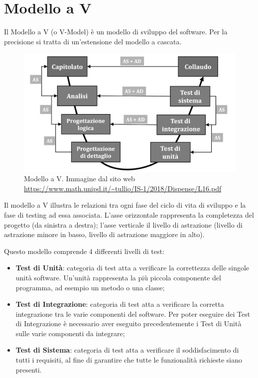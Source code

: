 \section{Modello a V}
\label{modelloV}

Il Modello a V (o V-Model) è un modello di sviluppo del software. Per la precisione si tratta di un'estensione del modello a cascata. 

\begin{figure}[H]
\centering
	\includegraphics[width=0.7\linewidth]{./images/modellov.jpg} 
	\caption{Modello a V. Immagine dal sito web \url{https://www.math.unipd.it/~tullio/IS-1/2018/Dispense/L16.pdf}}
	\label{vmodel}
\end{figure}

Il modello a V illustra le relazioni tra ogni fase del ciclo di vita di sviluppo e la fase di testing ad essa associata. L'asse orizzontale rappresenta la completezza del progetto (da sinistra a destra); l'asse verticale il livello di astrazione (livello di astrazione minore in basso, livello di astrazione maggiore in alto).

Questo modello comprende 4 differenti livelli di test: 
\begin{itemize}
	\item \textbf{Test di Unità}: categoria di test atta a verificare la correttezza delle singole unità software. Un'unità rappresenta la più piccola componente del programma, ad esempio un metodo o una classe;
	\item \textbf{Test di Integrazione}: categoria di test atta a verificare la corretta integrazione tra le varie componenti del software. Per poter eseguire dei Test di Integrazione è necessario aver eseguito precedentemente i Test di Unità sulle varie componenti da integrare;
	\item \textbf{Test di Sistema}: categoria di test atta a verificare il soddisfacimento di tutti i requisiti, al fine di garantire che tutte le funzionalità richieste siano presenti.
\end{itemize}

